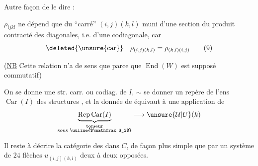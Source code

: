 Autre façon de le dire :

$\rho_{ijkl}$ ne dépend que du
``carré'' $(i,j)(k,l)$ muni d'une section
du produit contracté des diagonales,
i.e. d'une codiagonale, car
\[
\deleted{\unsure{\mathrm{car}}}\quad
\rho_{(i,j)(k,l)}=\rho_{(k,l)(i,j)}
\tag*{(9)}
\]

(\uline{NB} Cette relation n'a de sens que parce que
$\operatorname{End}(W)$ est supposé commutatif)

On se donne une  str. carr. ou
codiag. de $I$, $\sim$ se donner
un repère de l'ens $\operatorname{Car}(I)$ des
structures , et la donnée de
équivaut à une application de
\[
\underbrace{\operatorname{Rep}\operatorname{Car}(I)}_
{\substack{\text{torseur}\\\text{sous }\text{\uuline{$\mathfrak S_3$}}}}
\longrightarrow \unsure{\mathcal U|U}(k)
\]

Il reste à décrire la catégorie des
 dans $C$,  de façon
plus simple que par un système
de $24$ flèches $u_{(i,j)(k,l)}$ deux à deux opposées.
